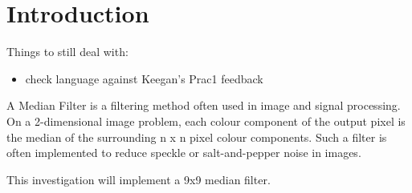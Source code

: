 \section{Introduction}
Things to still deal with:
\begin{itemize}
	\item check language against Keegan's Prac1 feedback
\end{itemize}
A Median Filter is a filtering method often used in image and signal processing. On a 2-dimensional image problem, each colour component of the output pixel is the median of the surrounding n x n pixel colour components. Such a filter is often implemented to reduce speckle or salt-and-pepper noise in images\cite{NSP}.

This investigation will implement a 9x9 median filter.

